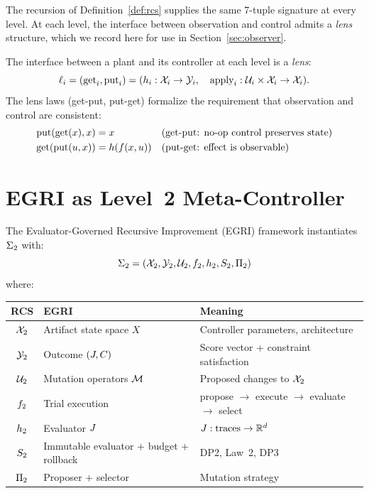 \documentclass[11pt,a4paper]{article}
\begin{document}
The recursion of Definition~\ref{def:rcs} supplies the same 7-tuple
signature at every level.  At each level, the interface between
observation and control admits a \emph{lens} structure, which we record
here for use in Section~\ref{sec:observer}.

\begin{definition}
\label{def:lens}
The interface between a plant and its controller at each level is a
\emph{lens}:
\begin{equation}
  \ell_i = (\text{get}_i, \text{put}_i)
  = (h_i : \mathcal{X}_i \to \mathcal{Y}_i, \quad
     \text{apply}_i : \mathcal{U}_i \times \mathcal{X}_i \to \mathcal{X}_i).
\end{equation}
The lens laws (get-put, put-get) formalize the requirement that observation
and control are consistent:
\begin{align}
  \text{put}(\text{get}(x), x) &= x
  & &\text{(get-put: no-op control preserves state)} \\
  \text{get}(\text{put}(u, x)) &= h(f(x, u))
  & &\text{(put-get: effect is observable)}
\end{align}
\end{definition}


\section{EGRI as Level~2 Meta-Controller}
\label{sec:egri}

\begin{definition}
\label{def:egri}
The Evaluator-Governed Recursive Improvement (EGRI) framework instantiates
$\Sigma_2$ with:
\begin{equation}
  \Sigma_2 = (\mathcal{X}_2, \mathcal{Y}_2, \mathcal{U}_2, f_2, h_2, S_2, \Pi_2)
\end{equation}
where:
\begin{center}
\begin{tabular}{@{}cll@{}}
  \toprule
  \textbf{RCS} & \textbf{EGRI} & \textbf{Meaning} \\
  \midrule
  $\mathcal{X}_2$ & Artifact state space $X$ & Controller parameters, architecture \\
  $\mathcal{Y}_2$ & Outcome $(J, C)$ & Score vector + constraint satisfaction \\
  $\mathcal{U}_2$ & Mutation operators $\mathcal{M}$ & Proposed changes to $\mathcal{X}_2$ \\
  $f_2$ & Trial execution & propose $\to$ execute $\to$ evaluate $\to$ select \\
  $h_2$ & Evaluator $J$ & $J : \text{traces} \to \mathbb{R}^d$ \\
  $S_2$ & Immutable evaluator $+$ budget $+$ rollback & DP2, Law~2, DP3 \\
  $\Pi_2$ & Proposer $+$ selector & Mutation strategy \\
  \bottomrule
\end{tabular}
\end{center}
\end{definition}
\end{document}
